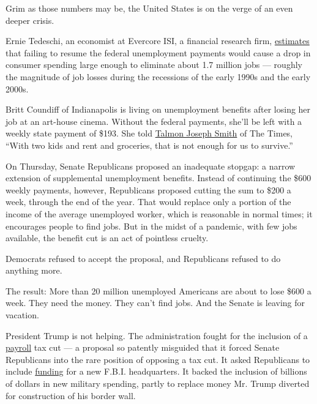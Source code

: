 Grim as those numbers may be, the United States is on the verge of an
even deeper crisis.

Ernie Tedeschi, an economist at Evercore ISI, a financial research firm,
\href{https://twitter.com/ernietedeschi/status/1283834505627865088}{estimates}
that failing to resume the federal unemployment payments would cause a
drop in consumer spending large enough to eliminate about 1.7 million
jobs --- roughly the magnitude of job losses during the recessions of
the early 1990s and the early 2000s.

Britt Coundiff of Indianapolis is living on unemployment benefits after
losing her job at an art-house cinema. Without the federal payments,
she'll be left with a weekly state payment of \$193. She told
\href{https://www.nytimes3xbfgragh.onion/2020/07/22/opinion/sunday/unemployment-supplement-congress.html}{Talmon
Joseph Smith} of The Times, ``With two kids and rent and groceries, that
is not enough for us to survive.''

On Thursday, Senate Republicans proposed an inadequate stopgap: a narrow
extension of supplemental unemployment benefits. Instead of continuing
the \$600 weekly payments, however, Republicans proposed cutting the sum
to \$200 a week, through the end of the year. That would replace only a
portion of the income of the average unemployed worker, which is
reasonable in normal times; it encourages people to find jobs. But in
the midst of a pandemic, with few jobs available, the benefit cut is an
act of pointless cruelty.

Democrats refused to accept the proposal, and Republicans refused to do
anything more.

The result: More than 20 million unemployed Americans are about to lose
\$600 a week. They need the money. They can't find jobs. And the Senate
is leaving for vacation.

President Trump is not helping. The administration fought for the
inclusion of a
\href{https://www.nytimes3xbfgragh.onion/2020/07/23/business/payroll-tax-cut-trump-recession.html}{payroll}
tax cut --- a proposal so patently misguided that it forced Senate
Republicans into the rare position of opposing a tax cut. It asked
Republicans to include
\href{https://www.nytimes3xbfgragh.onion/2020/07/28/us/politics/republicans-trump-fbi-building-virus-relief-bill.html}{funding}
for a new F.B.I. headquarters. It backed the inclusion of billions of
dollars in new military spending, partly to replace money Mr. Trump
diverted for construction of his border wall.

